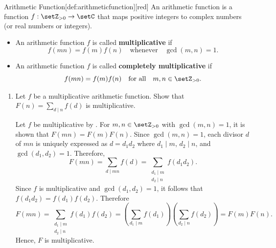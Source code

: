 \begin{define}{Arithmetic Function}[def:arithmeticfunction][red]
  An arithmetic function is a function $f:\setZ_{>0}\to\setC$ that maps 
  positive integers to complex numbers (or real numbers or integers).
  \begin{itemize}
    \item An arithmetic function $f$ is called \textbf{multiplicative} if
    \[
    f(mn)=f(m)f(n) \quad \text{whenever} \quad \gcd(m,n)=1.
    \]
    \item An arithmetic function $f$ is called \textbf{completely multiplicative} if
    \[
    f(mn)=f(m)f(n) \quad \text{for all} \quad m,n\in\setZ_{>0}.
    \]
  \end{itemize}
\end{define}

\begin{enumerate}
  \item Let $f$ be a multiplicative arithmetic function. Show that $F(n)=\sum_{d \mid n} f(d)$ is multiplicative.
  \begin{subprove}
    Let $f$ be multiplicative by . 
    For $m, n \in \setZ_{>0}$ with $\gcd(m,n) = 1$, it is shown that $F(mn) = F(m)F(n)$.
    Since $\gcd(m,n) = 1$, each divisor $d$ of $mn$ is uniquely expressed as 
    $d = d_1 d_2$ where $d_1 \mid m$, $d_2 \mid n$, and $\gcd(d_1, d_2) = 1$.
    Therefore,
    \[
    F(mn) = \sum_{d \mid mn} f(d) = \sum_{\substack{d_1 \mid m \\ d_2 \mid n}} f(d_1 d_2).
    \]
    Since $f$ is multiplicative and $\gcd(d_1, d_2) = 1$, it follows that $f(d_1 d_2) = f(d_1) f(d_2)$. Therefore
    \[
    F(mn) = \sum_{\substack{d_1 \mid m \\ d_2 \mid n}} f(d_1) f(d_2) = \left(\sum_{d_1 \mid m} f(d_1)\right) \left(\sum_{d_2 \mid n} f(d_2)\right) = F(m) F(n).
    \]
    Hence, $F$ is multiplicative.
  \end{subprove}
  

\end{enumerate}
